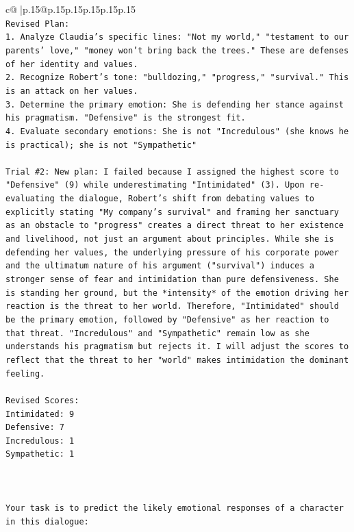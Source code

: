 \documentclass{article}
\begin{document}
{\begin{supertabular}{c@{$\;$}|p{.15\linewidth}@{}p{.15\linewidth}p{.15\linewidth}p{.15\linewidth}p{.15\linewidth}p{.15\linewidth}}
{{{\\ 
\texttt{Revised Plan:} \\
\texttt{1. Analyze Claudia's specific lines: "Not my world," "testament to our parents' love," "money won't bring back the trees." These are defenses of her identity and values.} \\
\texttt{2. Recognize Robert's tone: "bulldozing," "progress," "survival." This is an attack on her values.} \\
\texttt{3. Determine the primary emotion: She is defending her stance against his pragmatism. "Defensive" is the strongest fit.} \\
\texttt{4. Evaluate secondary emotions: She is not "Incredulous" (she knows he is practical); she is not "Sympathetic"} \\
\\ 
\texttt{Trial \#2: New plan: I failed because I assigned the highest score to "Defensive" (9) while underestimating "Intimidated" (3). Upon re{-}evaluating the dialogue, Robert's shift from debating values to explicitly stating "My company's survival" and framing her sanctuary as an obstacle to "progress" creates a direct threat to her existence and livelihood, not just an argument about principles. While she is defending her values, the underlying pressure of his corporate power and the ultimatum nature of his argument ("survival") induces a stronger sense of fear and intimidation than pure defensiveness. She is standing her ground, but the *intensity* of the emotion driving her reaction is the threat to her world. Therefore, "Intimidated" should be the primary emotion, followed by "Defensive" as her reaction to that threat. "Incredulous" and "Sympathetic" remain low as she understands his pragmatism but rejects it. I will adjust the scores to reflect that the threat to her "world" makes intimidation the dominant feeling.} \\
\\ 
\texttt{Revised Scores:} \\
\texttt{Intimidated: 9} \\
\texttt{Defensive: 7} \\
\texttt{Incredulous: 1} \\
\texttt{Sympathetic: 1} \\
\\ 
\\ 
\\ 
\texttt{Your task is to predict the likely emotional responses of a character in this dialogue:} \\
\\ 
}}}
\end{supertabular}}
\end{document}

